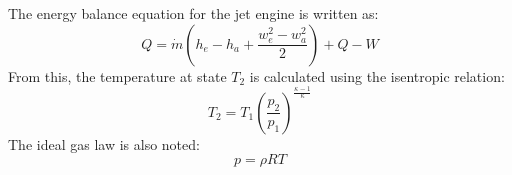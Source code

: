 The energy balance equation for the jet engine is written as:  
\[
Q = \dot{m} \left( h_e - h_a + \frac{w_e^2 - w_a^2}{2} \right) + Q - W
\]  
From this, the temperature at state \( T_2 \) is calculated using the isentropic relation:  
\[
T_2 = T_1 \left( \frac{p_2}{p_1} \right)^{\frac{\kappa - 1}{\kappa}}
\]  
The ideal gas law is also noted:  
\[
p = \rho R T
\]